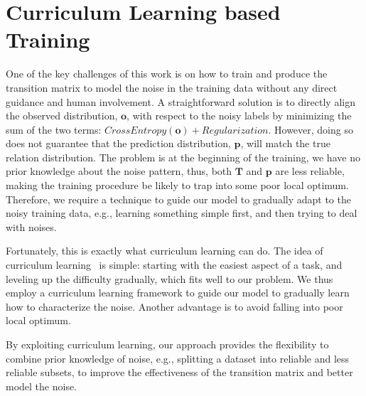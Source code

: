 \section{Curriculum Learning based Training \label{sec:training}}

One of the key challenges of this work is  on how to train and produce the transition matrix to model the noise  in the training data without any direct guidance and human involvement.
A straightforward solution is to directly align the observed distribution, $\mathbf{o}$, with respect to the noisy labels by minimizing the sum of the two terms:
$CrossEntropy(\mathbf{o}) + Regularization$. However, doing so
does not guarantee that the prediction distribution, $\mathbf{p}$, will match the true relation distribution.
The problem is at the beginning of the training, we have no prior knowledge about the noise pattern, 
thus, both  $\mathbf{T}$ and $\mathbf{p}$ are less reliable, making the training procedure be likely to trap into some poor local optimum.
Therefore, we require a technique to guide our model to gradually adapt to the noisy training data, e.g., learning something simple first, and then trying to deal with noises.

Fortunately, this is exactly what curriculum learning can do.
The idea of curriculum learning~\cite{bengio2009curriculum} is simple: starting with the easiest aspect of a task, and leveling up the difficulty gradually,
which fits well to our problem.
We thus employ a curriculum
learning framework to guide our model to gradually learn how to characterize the noise. 
Another advantage is to avoid falling into poor local optimum.


By exploiting curriculum learning, our approach  provides the
flexibility to combine prior knowledge of noise, e.g., splitting a dataset into reliable and less reliable subsets,  to improve the
effectiveness of  the transition matrix and better model the noise.



